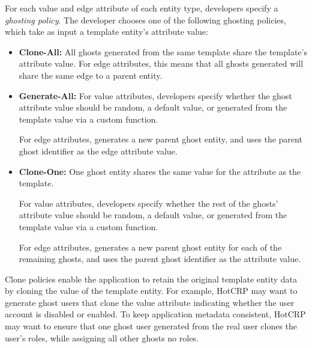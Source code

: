 For each value and edge attribute of each entity type, developers specify a \emph{ghosting policy}.
The developer chooses one of the following ghosting policies, which take as input a template
entity's attribute value:
\begin{itemize}
    \item \textbf{Clone-All:} All ghosts generated from the same template share the template's 
        attribute value. For edge attributes, this means that all ghosts generated will share the
        same edge to a parent entity.

    \item \textbf{Generate-All:} 
        For value attributes, developers specify whether the ghost attribute value should be
        random, a default value, or generated from the template value via a custom function.
        
        For edge attributes, \sys generates a new parent ghost entity, and uses the parent ghost
        identifier as the edge attribute value.

    \item \textbf{Clone-One:} One ghost entity shares the same value for the attribute as the
        template. 
        
        For value attributes, developers specify whether the rest of the ghosts' attribute value should be
        random, a default value, or generated from the template value via a custom function.

        For edge attributes, \sys generates a new parent ghost entity for each of the remaining
        ghosts, and uses the parent ghost identifier as the attribute value.
\end{itemize}
Clone policies enable the application to retain the original template entity data by cloning the value
of the template entity. For example, HotCRP may want to generate ghost users that clone 
the value attribute indicating whether the user account is disabled or enabled. To keep application
metadata consistent, HotCRP may want to ensure that one ghost user generated from the real user
clones the user's roles, while assigning all other ghosts no roles.




